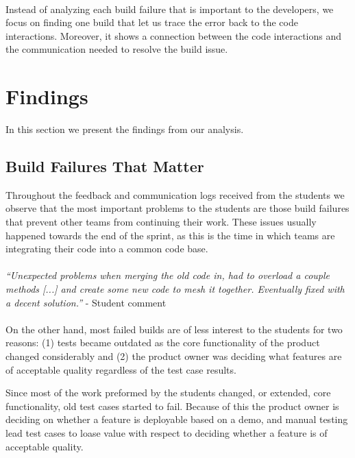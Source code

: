 \ \\
Instead of analyzing each build failure that is important to the developers, we focus on finding one build that let us trace the error back to the code interactions.
Moreover, it shows a connection between the code interactions and the communication needed to resolve the build issue.

\section{Findings}
\label{ch10:findings}
In this section we present the findings from our analysis.

\subsection{Build Failures That Matter}
Throughout the feedback and communication logs received from the students we observe that the most important problems to the students are those build failures that prevent other teams from continuing their work.
These issues usually happened towards the end of the sprint, as this is the time in which teams are integrating their code into a common code base.
\\ \ \\
\indent\emph{``Unexpected problems when merging the old code in, had to overload a couple methods [...]  and create some new code to mesh it together.  Eventually fixed with a decent solution.''} - Student comment
\\ \ \\
\indent On the other hand, most failed builds are of less interest to the students for two reasons: 
(1) tests became outdated as the core functionality of the product changed considerably 
and (2) the product owner was deciding what features are of acceptable quality regardless of the test case results.

Since most of the work preformed by the students changed, or extended, core functionality, old test cases started to fail.
Because of this the product owner is deciding on whether a feature is deployable based on a demo, and manual testing lead test cases to loase value with respect to deciding whether a feature is of acceptable quality.


